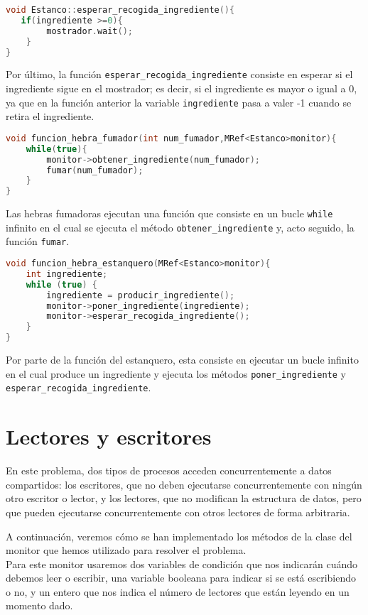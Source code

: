 \documentclass{article}
\begin{document}
\begin{lstlisting}[language=C++,caption=función recogida_ingrediente] 
void Estanco::esperar_recogida_ingrediente(){
   if(ingrediente >=0){
		mostrador.wait();
	}
}
\end{lstlisting}
Por último, la función \texttt{esperar\_recogida\_ingrediente} consiste en esperar si el ingrediente sigue en el mostrador; es decir, si el ingrediente es mayor o igual a 0, ya que en la función anterior la variable \texttt{ingrediente} pasa a valer -1 cuando se retira el ingrediente.
\begin{lstlisting}[language=C++,caption=función fumadores] 
void funcion_hebra_fumador(int num_fumador,MRef<Estanco>monitor){
	while(true){
		monitor->obtener_ingrediente(num_fumador);
		fumar(num_fumador);
	}
}
\end{lstlisting}
Las hebras fumadoras ejecutan una función que consiste en un bucle \texttt{while} infinito en el cual se ejecuta el método \texttt{obtener\_ingrediente} y, acto seguido, la función \texttt{fumar}.

\begin{lstlisting}[language=C++,caption=función estanquero] 
void funcion_hebra_estanquero(MRef<Estanco>monitor){
	int ingrediente;
	while (true) {
 		ingrediente = producir_ingrediente();
		monitor->poner_ingrediente(ingrediente);
		monitor->esperar_recogida_ingrediente();
	}
}
\end{lstlisting}
Por parte de la función del estanquero, esta consiste en ejecutar un bucle infinito en el cual produce un ingrediente y ejecuta los métodos \texttt{poner\_ingrediente} y \texttt{esperar\_recogida\_ingrediente}.


\section{Lectores y escritores}

En este problema, dos tipos de procesos acceden concurrentemente a datos compartidos: los escritores, que no deben ejecutarse concurrentemente con ningún otro escritor o lector, y los lectores, que no modifican la estructura de datos, pero que pueden ejecutarse concurrentemente con otros lectores de forma arbitraria.

A continuación, veremos cómo se han implementado los métodos de la clase del monitor que hemos utilizado para resolver el problema.\\

Para este monitor usaremos dos variables de condición que nos indicarán cuándo debemos leer o escribir, una variable booleana para indicar si se está escribiendo o no, y un entero que nos indica el número de lectores que están leyendo en un momento dado.
\end{document}
